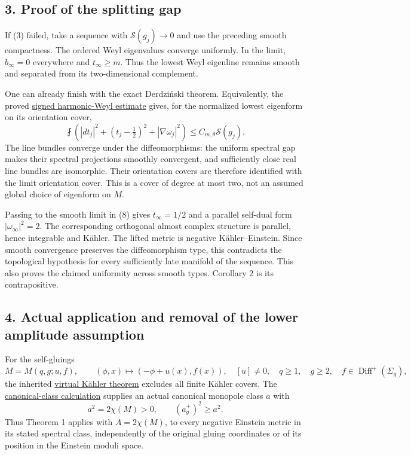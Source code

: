 \documentclass[
  11pt,
]{article}
\begin{document}
\hypertarget{proof-of-the-splitting-gap}{%
\subsection{3. Proof of the splitting
gap}\label{proof-of-the-splitting-gap}}

If (3) failed, take a sequence with \(\mathscr S(g_j)\to0\) and use the
preceding smooth compactness. The ordered Weyl eigenvalues converge
uniformly. In the limit, \(b_\infty=0\) everywhere and
\(t_\infty\ge m\). Thus the lowest Weyl eigenline remains smooth and
separated from its two-dimensional complement.

One can already finish with the exact Derdziński theorem. Equivalently,
the proved \href{line1_signed_harmonic_weyl.md}{signed harmonic-Weyl
estimate} gives, for the normalized lowest eigenform on its orientation
cover, \[
 \fint\left(|dt_j|^2+(t_j-\tfrac12)^2+|\nabla\omega_j|^2\right)
                        \le C_{m,\theta}\mathscr S(g_j).    \tag{8}
\] The line bundles converge under the diffeomorphisms: the uniform
spectral gap makes their spectral projections smoothly convergent, and
sufficiently close real line bundles are isomorphic. Their orientation
covers are therefore identified with the limit orientation cover. This
is a cover of degree at most two, not an assumed global choice of
eigenform on \(M\).

Passing to the smooth limit in (8) gives \(t_\infty=1/2\) and a parallel
self-dual form \(|\omega_\infty|^2=2\). The corresponding orthogonal
almost complex structure is parallel, hence integrable and Kähler. The
lifted metric is negative Kähler--Einstein. Since smooth convergence
preserves the diffeomorphism type, this contradicts the topological
hypothesis for every sufficiently late manifold of the sequence. This
also proves the claimed uniformity across smooth types. Corollary 2 is
its contrapositive.

\hypertarget{actual-application-and-removal-of-the-lower-amplitude-assumption}{%
\subsection{4. Actual application and removal of the lower amplitude
assumption}\label{actual-application-and-removal-of-the-lower-amplitude-assumption}}

For the self-gluings \[
 M=M(q,g;u,f),\qquad
 (\phi,x)\longmapsto(-\phi+u(x),f(x)),\quad [u]\ne0,
 \quad q\ge1,\quad g\ge2,\quad f\in\operatorname{Diff}^+(\Sigma_g),
\] the inherited \href{round11_kahler.md}{virtual Kähler theorem}
excludes all finite Kähler covers. The
\href{round12_global.md}{canonical-class calculation} supplies an actual
canonical monopole class \(a\) with \[
 a^2=2\chi(M)>0,\qquad (a_g^+)^2\ge a^2.
\] Thus Theorem 1 applies with \(A=2\chi(M)\), to every negative
Einstein metric in its stated spectral class, independently of the
original gluing coordinates or of its position in the Einstein moduli
space.
\end{document}
